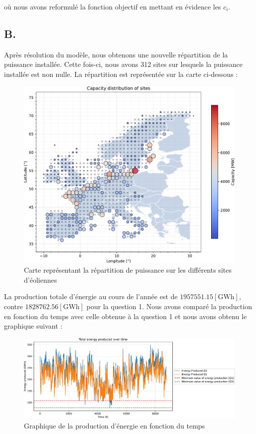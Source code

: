 \documentclass{article}
\newlength{\temp}
\begin{document}
où nous avons reformulé la fonction objectif en mettant en évidence les $c_i$.

\subsection*{B.}
Après résolution du modèle, nous obtenons une nouvelle répartition de la puissance installée. Cette fois-ci, nous avons 312 sites sur lesquels la puissance installée est non nulle. La répartition est représentée sur la carte ci-dessous :

\begin{figure}[h!]
    \centering
    \includegraphics[scale=0.4]{Images/Partie_1/Q3/capacity_distribution.pdf}
    \caption{Carte représentant la répartition de puissance sur les différents sites d'éoliennes}
    \label{fig:capacity_distribution_partie1_Q3}
\end{figure}

\newpage

La production totale d'énergie au cours de l'année est de $1957551.15 [\mathrm{GWh}]$, contre $1828762.56 [\mathrm{GWh}]$ pour la question 1. Nous avons comparé la production en fonction du temps avec celle obtenue à la question 1 et nous avons obtenu le graphique suivant :

\begin{figure}[h!]
    \centering
    \includegraphics[scale=0.5]{Images/Partie_1/Q3/energy_produced_comparison.pdf}
    \caption{Graphique de la production d'énergie en fonction du temps}
    \label{fig:energy_produced_partie1_Q3}
\end{figure}
\end{document}
